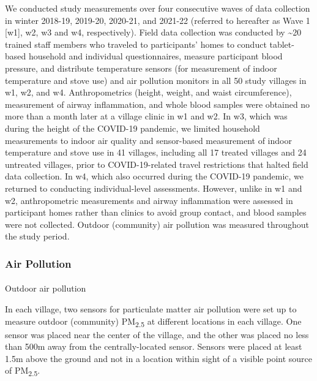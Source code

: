 \documentclass[
  letterpaper,
  DIV=11,
  numbers=noendperiod]{scrartcl}
\makeatletter
\let\oldparagraph\paragraph
\renewcommand{\paragraph}{
    \@ifstar
      \xxxParagraphStar
      \xxxParagraphNoStar
  }
\newcommand{\xxxParagraphStar}[1]{\oldparagraph*{#1}\mbox{}}
\newcommand{\xxxParagraphNoStar}[1]{\oldparagraph{#1}\mbox{}}
\makeatother
\begin{document}
We conducted study measurements over four consecutive waves of data
collection in winter 2018-19, 2019-20, 2020-21, and 2021-22 (referred to
hereafter as Wave 1 {[}w1{]}, w2, w3 and w4, respectively). Field data
collection was conducted by \textasciitilde20 trained staff members who
traveled to participants' homes to conduct tablet-based household and
individual questionnaires, measure participant blood pressure, and
distribute temperature sensors (for measurement of indoor temperature
and stove use) and air pollution monitors in all 50 study villages in
w1, w2, and w4. Anthropometrics (height, weight, and waist
circumference), measurement of airway inflammation, and whole blood
samples were obtained no more than a month later at a village clinic in
w1 and w2. In w3, which was during the height of the COVID-19 pandemic,
we limited household measurements to indoor air quality and sensor-based
measurement of indoor temperature and stove use in 41 villages,
including all 17 treated villages and 24 untreated villages, prior to
COVID-19-related travel restrictions that halted field data collection.
In w4, which also occurred during the COVID-19 pandemic, we returned to
conducting individual-level assessments. However, unlike in w1 and w2,
anthropometric measurements and airway inflammation were assessed in
participant homes rather than clinics to avoid group contact, and blood
samples were not collected. Outdoor (community) air pollution was
measured throughout the study period.

\subsubsection{Air Pollution}\label{air-pollution}

\paragraph{Outdoor air pollution}\label{outdoor-air-pollution}

In each village, two sensors for particulate matter air pollution were
set up to measure outdoor (community) PM\textsubscript{2.5} at different
locations in each village. One sensor was placed near the center of the
village, and the other was placed no less than 500m away from the
centrally-located sensor. Sensors were placed at least 1.5m above the
ground and not in a location within sight of a visible point source of
PM\textsubscript{2.5}.
\end{document}
